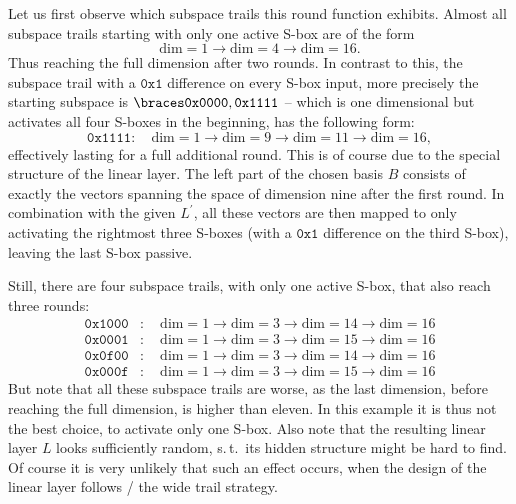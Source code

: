 \begin{example}
Let us first observe which subspace trails this round function exhibits.
Almost all subspace trails starting with only one active S-box are of the form
\begin{equation*}
    \mathrm{dim} = 1 \rightarrow \mathrm{dim} = 4 \rightarrow \mathrm{dim} = 16.
\end{equation*}
Thus reaching the full dimension after two rounds.
In contrast to this, the subspace trail with a $\mathtt{0x1}$ difference on every S-box input, more precisely the starting subspace is $\set{\mathtt{0x0000}, \mathtt{0x1111}}$ -- which is one dimensional but activates all four S-boxes in the beginning, has the following form:
\begin{equation}\label{st:eqn:example1}
    \mathtt{0x1111} :\quad \mathrm{dim} = 1 \rightarrow \mathrm{dim} = 9 \rightarrow \mathrm{dim} = 11 \rightarrow \mathrm{dim} = 16,
\end{equation}
effectively lasting for a full additional round.
This is of course due to the special structure of the linear layer.
The left part of the chosen basis $B$ consists of exactly the vectors spanning the space of dimension nine after the first round.
In combination with the given $L^\prime$, all these vectors are then mapped to only activating the rightmost three S-boxes (with a $\mathtt{0x1}$ difference on the third S-box), leaving the last S-box passive.

Still, there are four subspace trails, with only one active S-box, that also reach three rounds:
\begin{align*}
    \mathtt{0x1000} &:\quad \mathrm{dim} = 1 \rightarrow \mathrm{dim} = 3 \rightarrow \mathrm{dim} = 14 \rightarrow \mathrm{dim} = 16 \\
    \mathtt{0x0001} &:\quad \mathrm{dim} = 1 \rightarrow \mathrm{dim} = 3 \rightarrow \mathrm{dim} = 15 \rightarrow \mathrm{dim} = 16 \\
    \mathtt{0x0f00} &:\quad \mathrm{dim} = 1 \rightarrow \mathrm{dim} = 3 \rightarrow \mathrm{dim} = 14 \rightarrow \mathrm{dim} = 16 \\
    \mathtt{0x000f} &:\quad \mathrm{dim} = 1 \rightarrow \mathrm{dim} = 3 \rightarrow \mathrm{dim} = 15 \rightarrow \mathrm{dim} = 16
\end{align*}
But note that all these subspace trails are worse, as the last dimension, before reaching the full dimension, is higher than eleven.
In this example it is thus not the best choice, to activate only one S-box.
Also note that the resulting linear layer $L$ looks sufficiently random, s.\,t.\ its hidden structure might be hard to find.
Of course it is very unlikely that such an effect occurs, when the design of the linear layer follows \eg/ the wide trail strategy.
\end{example}

